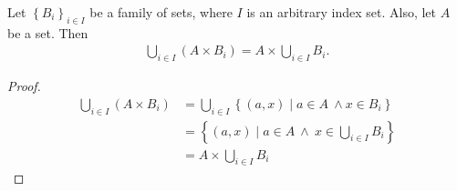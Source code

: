 \begin{theorem}\label{thrm:cartesian_product_union}
	Let $\left\{B_i\right\}_{i\in I}$ be a family of sets, where $I$ is an arbitrary index set. Also, let $A$ be a set. Then 
	\begin{align}\label{eq:cartesian_product_union}
		\bigcup_{i\in I}(A\times B_i) = A\times \bigcup_{i\in I}B_i.
	\end{align}
\end{theorem}

\begin{proof}
	\begin{align*}
		\bigcup_{i\in I}(A\times B_i) &= \bigcup_{i\in I}\left\{(a, x) \mid a\in A \ \wedge x\in B_i \right\} \\ &= \left\{ (a, x)\mid a\in A\ \wedge\ x\in \bigcup_{i\in I}B_i \right\} \\ &= A\times \bigcup_{i\in I}B_i
	\end{align*}
\end{proof}